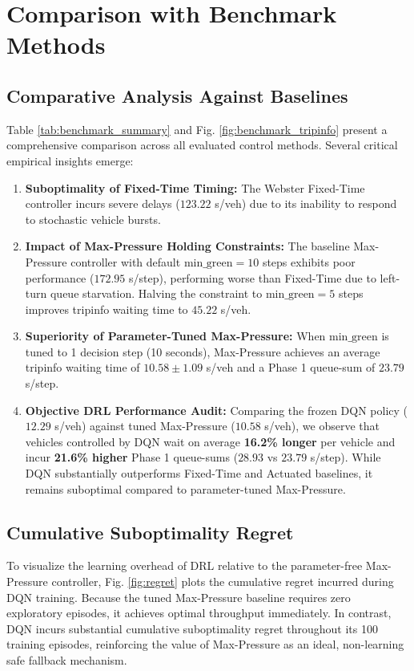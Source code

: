 \documentclass{ieeeaccess}
\begin{document}
\section{Comparison with Benchmark Methods}
\label{sec:benchmarks}

\subsection{Comparative Analysis Against Baselines}
Table \ref{tab:benchmark_summary} and Fig. \ref{fig:benchmark_tripinfo} present a comprehensive comparison across all evaluated control methods. Several critical empirical insights emerge:
\begin{enumerate}
    \item \textbf{Suboptimality of Fixed-Time Timing:} The Webster Fixed-Time controller incurs severe delays ($123.22$ s/veh) due to its inability to respond to stochastic vehicle bursts.
    \item \textbf{Impact of Max-Pressure Holding Constraints:} The baseline Max-Pressure controller with default $\text{min\_green} = 10$ steps exhibits poor performance ($172.95$ s/step), performing worse than Fixed-Time due to left-turn queue starvation. Halving the constraint to $\text{min\_green} = 5$ steps improves tripinfo waiting time to $45.22$ s/veh.
    \item \textbf{Superiority of Parameter-Tuned Max-Pressure:} When $\text{min\_green}$ is tuned to 1 decision step (10 seconds), Max-Pressure achieves an average tripinfo waiting time of $10.58 \pm 1.09$ s/veh and a Phase 1 queue-sum of $23.79$ s/step.
    \item \textbf{Objective DRL Performance Audit:} Comparing the frozen DQN policy ($12.29$ s/veh) against tuned Max-Pressure ($10.58$ s/veh), we observe that vehicles controlled by DQN wait on average \textbf{16.2\% longer} per vehicle and incur \textbf{21.6\% higher} Phase 1 queue-sums ($28.93$ vs $23.79$ s/step). While DQN substantially outperforms Fixed-Time and Actuated baselines, it remains suboptimal compared to parameter-tuned Max-Pressure.
\end{enumerate}

\subsection{Cumulative Suboptimality Regret}
To visualize the learning overhead of DRL relative to the parameter-free Max-Pressure controller, Fig. \ref{fig:regret} plots the cumulative regret incurred during DQN training. Because the tuned Max-Pressure baseline requires zero exploratory episodes, it achieves optimal throughput immediately. In contrast, DQN incurs substantial cumulative suboptimality regret throughout its 100 training episodes, reinforcing the value of Max-Pressure as an ideal, non-learning safe fallback mechanism.
\end{document}
